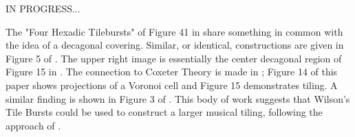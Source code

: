 \documentclass[11pt]{article}
\begin{document}
IN PROGRESS...

The "Four Hexadic Tilebursts" of Figure 41 in \cite{wilson1989} share something in common with the idea of a decagonal covering. Similar, or identical, constructions are given in Figure 5 of \cite{sasisekharan1986}. The upper right image is essentially the center decagonal region of Figure 15 in \cite{gummelt1996}. The connection to Coxeter Theory is made in \cite{Koca2017}; Figure 14 of this paper shows projections of a Voronoi cell and Figure 15 demonstrates tiling. A similar finding is shown  in Figure 3 of \cite{Koca2023}. This body of work suggests that Wilson's Tile Bursts could be used to construct a larger musical tiling, following the approach of \cite{sasisekharan1986}.  

\end{document}
